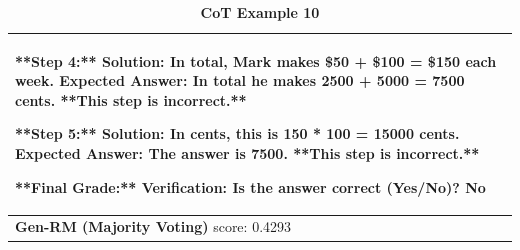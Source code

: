 \begin{table}[ht]
\begin{tabular}{ |p{16.4cm}| }
{**Step 4:**\newline
Solution: In total, Mark makes \$50 + \$100 = \$150 each week.\newline
Expected Answer: In total he makes 2500 + 5000 = 7500 cents.\newline
**This step is incorrect.**\newline

**Step 5:**\newline
Solution: In cents, this is 150 * 100 = 15000 cents.\newline
Expected Answer: The answer is 7500.\newline
**This step is incorrect.**\newline

**Final Grade:**\newline
Verification: {\color{blue}Is the answer correct (Yes/No)? No}
\newline
} \\
\midrule
{\textbf{Gen-RM (Majority Voting)} score: {\color{blue}0.4293}} \\
\midrule
\end{tabular}
\caption{
\textbf{{\genV} CoT Example 10}}
\label{cot-verifier-example-9-full-text}
\end{table}






